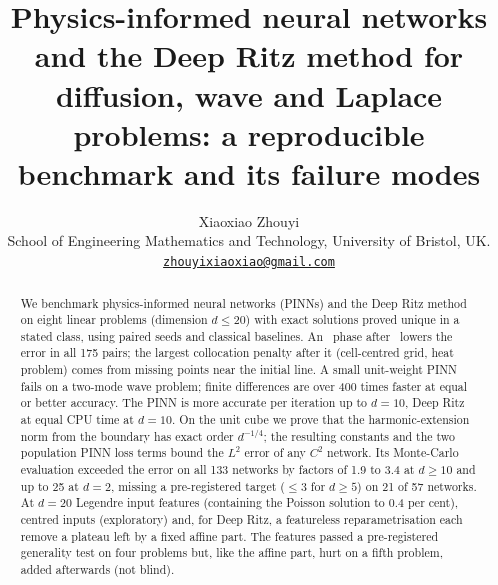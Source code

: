 \documentclass[11pt,a4paper]{article}
\title{Physics-informed neural networks and the Deep Ritz method for diffusion, wave and
Laplace problems: a reproducible benchmark and its failure modes}
\author{Xiaoxiao Zhouyi\\[0.4em]
\small School of Engineering Mathematics and Technology, University of Bristol, UK.\\
\small \href{mailto:zhouyixiaoxiao@gmail.com}{\texttt{zhouyixiaoxiao@gmail.com}}}
\date{}
\begin{document}
\maketitle

\begin{abstract}
\noindent
We benchmark physics-informed neural networks (PINNs) and the Deep Ritz method on eight linear
problems (dimension $d\le20$) with exact solutions proved unique in a stated class, using paired seeds and classical baselines. An \LBFGS\
phase after \Adam\ lowers the error in all 175 pairs; the largest collocation
penalty after it (cell-centred grid, heat problem) comes from missing points near the
initial line.
A small unit-weight PINN fails on a two-mode wave problem; finite differences are over
400 times faster at equal or better accuracy.
The PINN is more accurate per iteration up to $d=10$, Deep Ritz at equal CPU time at $d=10$.
On the unit cube we prove that the harmonic-extension norm from the boundary has exact order
$d^{-1/4}$; the resulting constants and the two population PINN loss terms bound
the $L^2$ error of any $C^2$ network. Its Monte-Carlo evaluation exceeded the error on all 133 networks by
factors of 1.9 to 3.4 at $d\ge10$ and up to 25 at $d=2$, missing a pre-registered
target ($\le3$ for $d\ge5$) on 21 of 57 networks.
At $d=20$ Legendre input features (containing the Poisson solution to 0.4 per cent), centred
inputs (exploratory) and, for Deep Ritz, a featureless reparametrisation each remove a plateau
left by a fixed affine part. The features passed a pre-registered generality test on four
problems but, like the affine part, hurt on a fifth problem, added afterwards (not blind).
\end{abstract}
\end{document}
